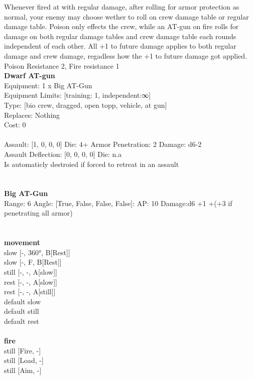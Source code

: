 \noindent Whenever fired at with regular damage, after rolling for armor protection as normal, your enemy may choose wether to roll on crew damage table or regular damage table. Poison only effects the crew, while an AT-gun on fire rolls for damage on both regular damage tables and crew damage table each rounds independent of each other. All +1 to future damage applies to both regular damage and crew damage, regadless how the +1 to future damage got applied.\\ 
 Poison Resistance 2, Fire resistance 1\\ 


{\bf Dwarf AT-gun } \\
Equipment: 1 x Big AT-Gun \\
Equipment Limits: [training: 1, independent:∞] \\
Type: [bio crew, dragged, open topp, vehicle, at gun] \\
Replaces: Nothing \\
Cost: 0\\
\ \\
Assault: [1, 0, 0, 0] Die: 4+ Armor Penetration: 2 Damage: d6-2 \\
Assault Deflection: [0, 0, 0, 0] Die: n.a\\
\indent Is automaticly destroied if forced to retreat in an assault\\ 
 
\ \\

\ \\
{\bf Big AT-Gun } \\



Range: 6  Angle: [True, False, False, False]: AP: 10 Damage:d6 +1 +(+3 if penetrating all armor) \\




 
\ \\



\ \\ {\bf movement } \\
slow [-, 360°, B[Rest]] \\
slow [-, F, B[Rest]] \\
still [-, -, A[slow]] \\
rest [-, -, A[slow]] \\
rest [-, -, A[still]] \\
default slow \\
default still \\
default rest \\
\ \\ {\bf fire } \\
still [Fire, -] \\
still [Load, -] \\
still [Aim, -] \\



